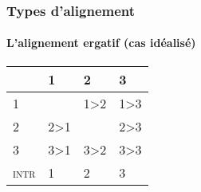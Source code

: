 



\begin{frame}
\frametitle{Types d'alignement}
\framesubtitle{L'alignement ergatif (cas idéalisé)}

\begin{table}[H] 
   \centering \label{tab:erg}
   \begin{tabular}{l|lll|} 
     \toprule
     &1 & 2 &3\\
     \midrule
     1 &\grise{} &1>2\cellcolor[wave]{530} & 1>3 \cellcolor[wave]{630} \\
     2&2>1\cellcolor[wave]{465}&\grise{}&2>3 \cellcolor[wave]{630} \\
     3&3>1 \cellcolor[wave]{465}&3>2 \cellcolor[wave]{530}&3>3\cellcolor[wave]{630}\\
     \midrule
     \textsc{intr}&\cellcolor[wave]{465}1&\cellcolor[wave]{530}2&\cellcolor[wave]{630}3\\
     \bottomrule
   \end{tabular}
 \end{table}


\end{frame}















